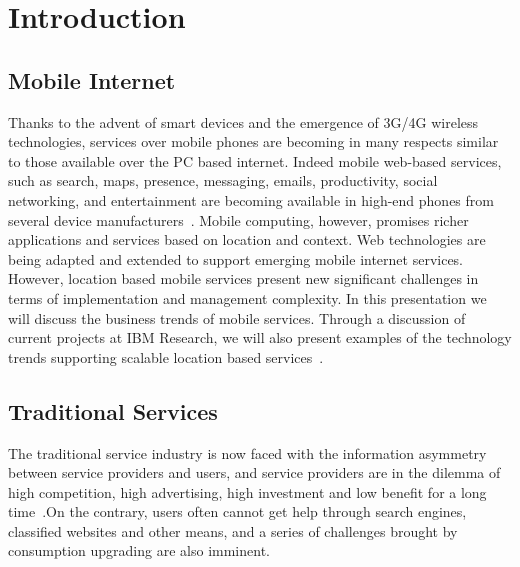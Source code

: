 \documentclass{elsarticle}
\begin{document}

\section{Introduction}\label{sec:intro}

\subsection{Mobile Internet}
Thanks to the advent of smart devices and the emergence of 3G/4G wireless technologies, services over mobile phones are becoming in many respects similar to those available over the PC based internet. Indeed mobile web-based services, such as search, maps, presence, messaging, emails, productivity, social networking, and entertainment are becoming available in high-end phones from several device manufacturers~\cite{hlw3,hlw8}. Mobile computing, however, promises richer applications and services based on location and context. Web technologies are being adapted and extended to support emerging mobile internet services. However, location based mobile services present new significant challenges in terms of implementation and management complexity. In this presentation we will discuss the business trends of mobile services. Through a discussion of current projects at IBM Research, we will also present examples of the technology trends supporting scalable location based services~\cite{MSBTT,MSBTT2,MB}.


\subsection{Traditional Services} 

The traditional service industry is now faced with the information asymmetry between service providers and users, and service providers are in the dilemma of high competition, high advertising, high investment and low benefit for a long time~\cite{hlw,hlw2,hlw7}.On the contrary, users often cannot get help through search engines, classified websites and other means, and a series of challenges brought by consumption upgrading are also imminent.
\end{document}
